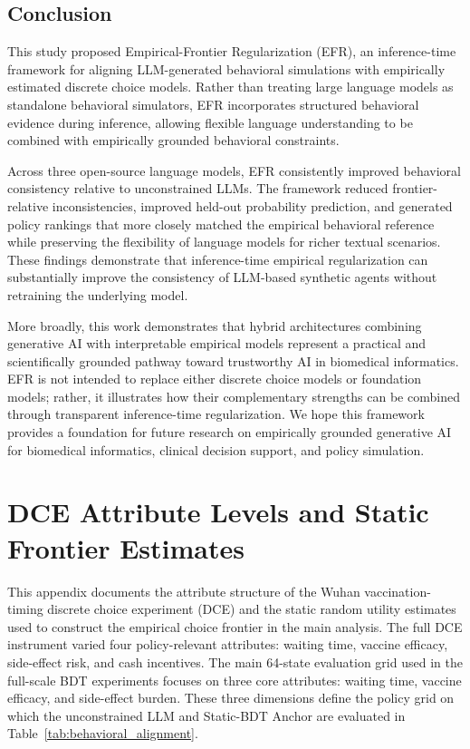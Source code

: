 \documentclass[11pt]{article}
\begin{document}
\subsection{Conclusion}
\label{sec:conclusion}

This study proposed Empirical-Frontier Regularization (EFR), an inference-time framework for aligning LLM-generated behavioral simulations with empirically estimated discrete choice models. Rather than treating large language models as standalone behavioral simulators, EFR incorporates structured behavioral evidence during inference, allowing flexible language understanding to be combined with empirically grounded behavioral constraints.

Across three open-source language models, EFR consistently improved behavioral consistency relative to unconstrained LLMs. The framework reduced frontier-relative inconsistencies, improved held-out probability prediction, and generated policy rankings that more closely matched the empirical behavioral reference while preserving the flexibility of language models for richer textual scenarios. These findings demonstrate that inference-time empirical regularization can substantially improve the consistency of LLM-based synthetic agents without retraining the underlying model.

More broadly, this work demonstrates that hybrid architectures combining generative AI with interpretable empirical models represent a practical and scientifically grounded pathway toward trustworthy AI in biomedical informatics. EFR is not intended to replace either discrete choice models or foundation models; rather, it illustrates how their complementary strengths can be combined through transparent inference-time regularization. We hope this framework provides a foundation for future research on empirically grounded generative AI for biomedical informatics, clinical decision support, and policy simulation.

\clearpage




\clearpage

\appendix

\section{DCE Attribute Levels and Static Frontier Estimates}
\label{app:dce_attributes}

This appendix documents the attribute structure of the Wuhan vaccination-timing discrete choice experiment (DCE) and the static random utility estimates used to construct the empirical choice frontier in the main analysis. The full DCE instrument varied four policy-relevant attributes: waiting time, vaccine efficacy, side-effect risk, and cash incentives. The main 64-state evaluation grid used in the full-scale BDT experiments focuses on three core attributes: waiting time, vaccine efficacy, and side-effect burden. These three dimensions define the policy grid on which the unconstrained LLM and Static-BDT Anchor are evaluated in Table~\ref{tab:behavioral_alignment}.
\end{document}
